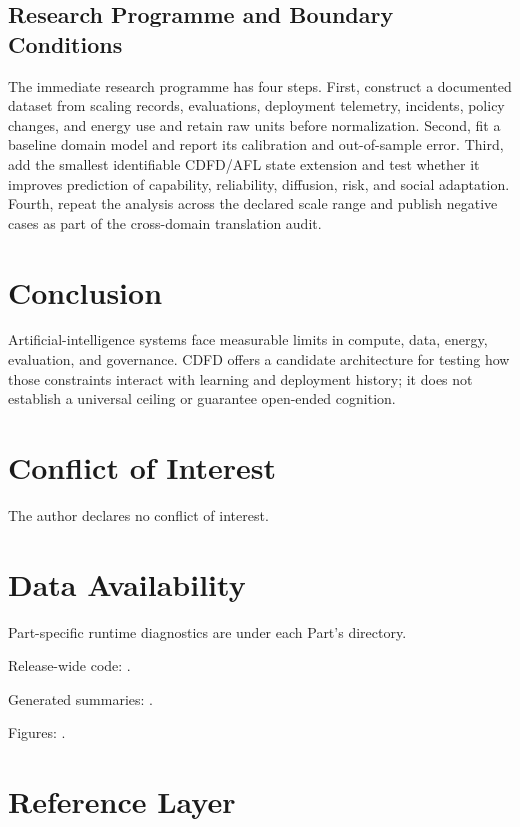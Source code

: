 \documentclass[11pt,a4paper]{article}
\begin{document}
\subsection{Research Programme and Boundary Conditions}

The immediate research programme has four steps. First, construct a documented
dataset from scaling records, evaluations, deployment telemetry, incidents, policy changes, and energy use and retain raw units before normalization.
Second, fit a baseline domain model and report its calibration and out-of-sample
error. Third, add the smallest identifiable CDFD/AFL state extension and test
whether it improves prediction of capability, reliability, diffusion, risk, and social adaptation. Fourth, repeat the
analysis across the declared scale range and publish negative cases as part of
the cross-domain translation audit.


\section{Conclusion}
Artificial-intelligence systems face measurable limits in compute, data, energy, evaluation, and governance. CDFD offers a candidate architecture for testing how those constraints interact with learning and deployment history; it does not establish a universal ceiling or guarantee open-ended cognition.
\section*{Conflict of Interest} The author declares no conflict of interest.
\section*{Data Availability}
Part-specific runtime diagnostics are under each Part's  directory.

Release-wide code: .

Generated summaries: .

Figures: .


\section{Reference Layer}


\end{document}

